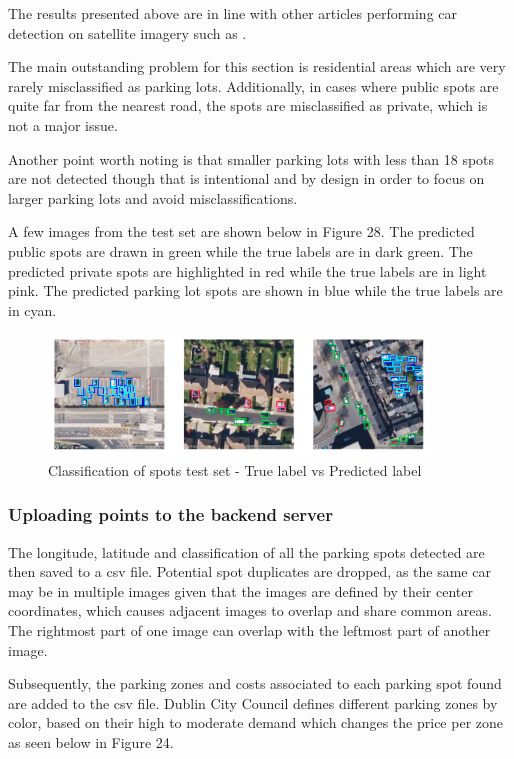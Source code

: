 The results presented above are in line with other articles performing car
detection on satellite imagery such as \cite{similarresults}.

The main outstanding problem for this section is residential areas which are
very rarely misclassified as parking lots. Additionally, in cases where public
spots are quite far from the nearest road, the spots are misclassified as
private, which is not a major issue.

Another point worth noting is that smaller parking lots with less than 18 spots
are not detected though that is intentional and by design in order to focus on
larger parking lots and avoid misclassifications.

A few images from the test set are shown below in Figure 28.
The predicted public spots are drawn in green while the true labels are in dark
green. The predicted private spots are highlighted in red while the true labels
are in light pink. The predicted parking lot spots are shown in blue while the
true labels are in cyan.

\begin{figure}[htbp]
  \centering
  \includegraphics[width=0.9\textwidth]{images/classification-spots-test.png}
  \caption{Classification of spots test set - True label vs Predicted label}
\end{figure}

\newpage{}

\subsubsection{Uploading points to the backend server}
The longitude, latitude and classification of all the parking spots detected are
then saved to a csv file. Potential spot duplicates are dropped, as the same car
may be in multiple images given that the images are defined by their center
coordinates, which causes adjacent images to overlap and share common areas. The
rightmost part of one image can overlap with the leftmost part of another image.

Subsequently, the parking zones and costs associated to each parking spot found
are added to the csv file. Dublin City Council defines different parking zones
by color, based on their high to moderate demand which changes the price per
zone as seen below in Figure 24.


